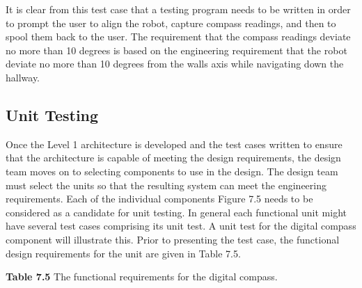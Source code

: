 {It is clear from this test case that a testing program needs to be
written in order to prompt the user to align the robot, capture compass
readings, and then to spool them back to the user. The requirement that
the compass readings deviate no more than 10 degrees is based on the
engineering requirement that the robot deviate no more than 10 degrees
from the walls axis while navigating down the hallway.

\subsection*{Unit Testing}
\label{subsection:unit-testing-1}


Once the Level 1 architecture is developed and the test cases written to
ensure that the architecture is capable of meeting the design
requirements, the design team moves on to selecting components to use in
the design. The design team must select the units so that the resulting
system can meet the engineering requirements. Each of the individual
components Figure 7.5 needs to be considered as a candidate for unit
testing. In general each functional unit might have several test cases
comprising its unit test. A unit test for the digital compass component
will illustrate this. Prior to presenting the test case, the functional
design requirements for the unit are given in Table 7.5.

\textbf{Table 7.5} The functional requirements for the digital compass.

}
